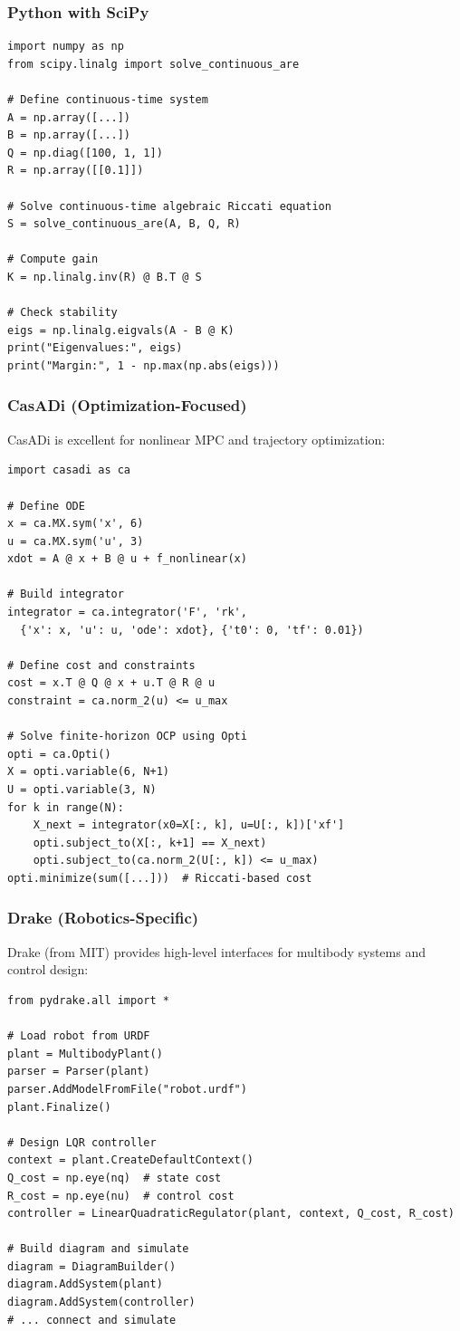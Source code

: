 \subsubsection{Python with SciPy}

\begin{verbatim}
import numpy as np
from scipy.linalg import solve_continuous_are

# Define continuous-time system
A = np.array([...])
B = np.array([...])
Q = np.diag([100, 1, 1])
R = np.array([[0.1]])

# Solve continuous-time algebraic Riccati equation
S = solve_continuous_are(A, B, Q, R)

# Compute gain
K = np.linalg.inv(R) @ B.T @ S

# Check stability
eigs = np.linalg.eigvals(A - B @ K)
print("Eigenvalues:", eigs)
print("Margin:", 1 - np.max(np.abs(eigs)))
\end{verbatim}

\subsubsection{CasADi (Optimization-Focused)}

CasADi is excellent for nonlinear MPC and trajectory optimization:
\begin{verbatim}
import casadi as ca

# Define ODE
x = ca.MX.sym('x', 6)
u = ca.MX.sym('u', 3)
xdot = A @ x + B @ u + f_nonlinear(x)

# Build integrator
integrator = ca.integrator('F', 'rk',
  {'x': x, 'u': u, 'ode': xdot}, {'t0': 0, 'tf': 0.01})

# Define cost and constraints
cost = x.T @ Q @ x + u.T @ R @ u
constraint = ca.norm_2(u) <= u_max

# Solve finite-horizon OCP using Opti
opti = ca.Opti()
X = opti.variable(6, N+1)
U = opti.variable(3, N)
for k in range(N):
    X_next = integrator(x0=X[:, k], u=U[:, k])['xf']
    opti.subject_to(X[:, k+1] == X_next)
    opti.subject_to(ca.norm_2(U[:, k]) <= u_max)
opti.minimize(sum([...]))  # Riccati-based cost
\end{verbatim}

\subsubsection{Drake (Robotics-Specific)}

Drake (from MIT) provides high-level interfaces for multibody systems and control design:
\begin{verbatim}
from pydrake.all import *

# Load robot from URDF
plant = MultibodyPlant()
parser = Parser(plant)
parser.AddModelFromFile("robot.urdf")
plant.Finalize()

# Design LQR controller
context = plant.CreateDefaultContext()
Q_cost = np.eye(nq)  # state cost
R_cost = np.eye(nu)  # control cost
controller = LinearQuadraticRegulator(plant, context, Q_cost, R_cost)

# Build diagram and simulate
diagram = DiagramBuilder()
diagram.AddSystem(plant)
diagram.AddSystem(controller)
# ... connect and simulate
\end{verbatim}

